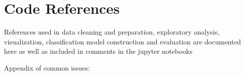 \documentclass[sigconf]{acmart}
\begin{document}

 


\appendix

\section{Code References}
References used in data cleaning and preparation, exploratory analysis, 
visualization, classification model construction and evaluation are documented
here as well as included in comments in the jupyter notebooks 
\cite{muller17,mckinney17,vanderplas17}

Appendix of common issues: 




%
\end{document}
